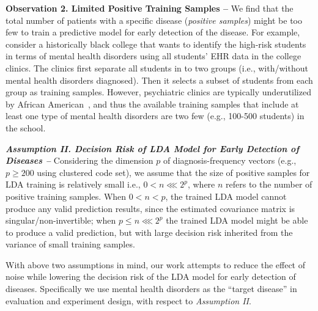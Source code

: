 \textbf{Observation 2.  Limited Positive Training Samples -- } We find that the total number of patients with a specific disease (\emph{positive samples}) might be too few to train a predictive model for early detection of the disease.
For example, consider a historically black college that wants to identify the high-risk students in terms of mental health disorders using all students' EHR data in the college clinics.
The clinics first separate all students in to two groups (i.e., with/without mental health disorders diagnosed).
Then it selects a subset of students from each group as training samples.
However, psychiatric clinics are typically underutilized by African American~\cite{thompson2004african}, and thus the available training samples that include at least one type of mental health disorders are two few (e.g., 100-500 students) in the school.



\textbf{\em Assumption II.  Decision Risk of LDA Model for Early Detection of Diseases -- } Considering the dimension $p$ of diagnosis-frequency vectors (e.g., $p\geq 200$ using clustered code set), we assume that the size of positive samples for LDA training is relatively small i.e., $0<n\lll 2^p$, where $n$ refers to the number of positive training samples.
When $0<n<p$, the trained LDA model cannot produce any valid prediction results, since the estimated covariance matrix is singular/non-invertible; when $p\leq n\lll 2^p$ the trained LDA model might be able to produce a valid prediction, but with large decision risk inherited from the variance of small training samples.
 

With above two assumptions in mind, our work attempts to reduce the effect of noise while lowering the decision risk of the LDA model for early detection of diseases.
Specifically we use mental health disorders as the ``target disease'' in evaluation and experiment design, with respect to  {\em Assumption II}.


